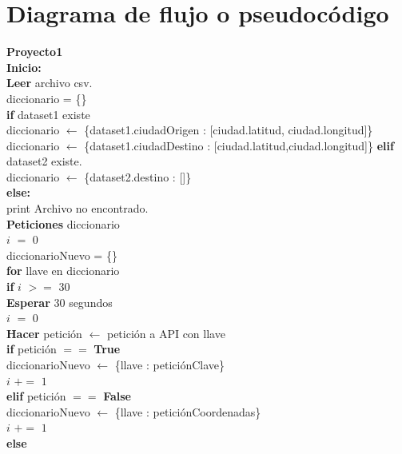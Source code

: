 \documentclass[]{article}
\begin{document}
\section{Diagrama de flujo o pseudocódigo}
\textbf{Proyecto1}\\
\textbf{Inicio:}\\
\indent \textbf{Leer} archivo csv.\\
\indent\indent diccionario = \{\}\\
\indent\indent \textbf{if} dataset1 existe\\
\indent\indent\indent diccionario $ \leftarrow $ \{dataset1.ciudadOrigen : [ciudad.latitud, ciudad.longitud]\} \\
\indent\indent\indent diccionario $ \leftarrow $ \{dataset1.ciudadDestino : [ciudad.latitud,ciudad.longitud]\}
\indent\indent \textbf{elif} dataset2 existe.\\
\indent\indent\indent diccionario $ \leftarrow $ \{dataset2.destino : []\}\\
\indent\indent \textbf{else:}\\
\indent\indent\indent print Archivo no encontrado.\\
\indent \textbf{Peticiones} diccionario\\
\indent\indent $ i $ $ = $ $ 0 $\\
\indent\indent diccionarioNuevo = \{\} \\
\indent\indent \textbf{for} llave en diccionario\\
\indent\indent\indent \textbf{if} $ i $ $ >= $ $ 30 $\\
\indent\indent\indent\indent \textbf{Esperar} 30 segundos\\
\indent\indent\indent\indent $ i $ $ = $ $ 0 $\\
\indent\indent\indent \textbf{Hacer} petición $ \leftarrow $ petición a API con llave\\
\indent\indent\indent \textbf{if} petición $ == $ \textbf{True}\\
\indent\indent\indent\indent diccionarioNuevo $ \leftarrow $ \{llave : peticiónClave\}\\
\indent\indent\indent\indent $ i $ $ += $ $ 1 $\\
\indent\indent\indent \textbf{elif} petición $ == $ \textbf{False}\\
\indent\indent\indent\indent diccionarioNuevo $ \leftarrow $ \{llave : peticiónCoordenadas\}\\
\indent\indent\indent\indent $ i $ $ += $ $ 1 $\\
\indent\indent\indent \textbf{else}\\
\end{document}
